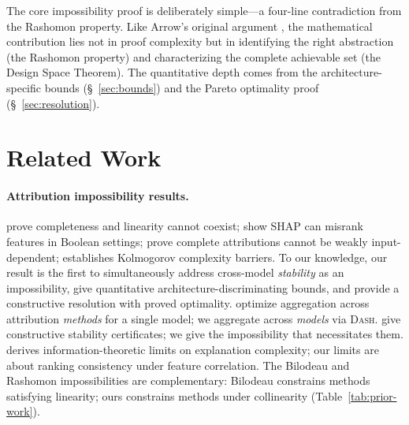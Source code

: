 \documentclass{jmlr}
\newcommand{\DASH}{\textsc{Dash}}
\begin{document}
The core impossibility proof is deliberately simple---a four-line contradiction from the Rashomon property.
Like Arrow's original argument \citep{arrow1951social}, the mathematical contribution lies not in proof complexity but in identifying the right abstraction (the Rashomon property) and characterizing the complete achievable set (the Design Space Theorem).
The quantitative depth comes from the architecture-specific bounds (\S~\ref{sec:bounds}) and the Pareto optimality proof (\S~\ref{sec:resolution}).


\section{Related Work}
\label{sec:related}

\paragraph{Attribution impossibility results.}
\citet{bilodeau2024impossibility} prove completeness and linearity cannot coexist; \citet{huang2024failings} show SHAP can misrank features in Boolean settings; \citet{srinivas2019full} prove complete attributions cannot be weakly input-dependent; \citet{rao2025limits} establishes Kolmogorov complexity barriers.
To our knowledge, our result is the first to simultaneously address cross-model \emph{stability} as an impossibility, give quantitative architecture-discriminating bounds, and provide a constructive resolution with proved optimality.
\citet{decker2024provably} optimize aggregation across attribution \emph{methods} for a single model; we aggregate across \emph{models} via \DASH{}.
\citet{jin2025probabilistic} give constructive stability certificates; we give the impossibility that necessitates them.
\citet{noguer2025mathematical} derives information-theoretic limits on explanation complexity; our limits are about ranking consistency under feature correlation.
The Bilodeau and Rashomon impossibilities are complementary: Bilodeau constrains methods satisfying linearity; ours constrains methods under collinearity (Table~\ref{tab:prior-work}).
\end{document}
